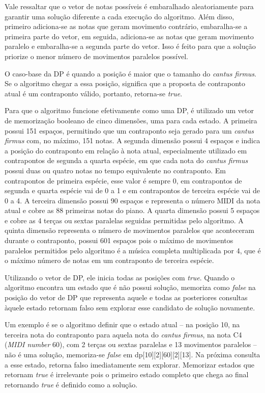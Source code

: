     Vale ressaltar que o vetor de notas possíveis é embaralhado aleatoriamente para garantir uma solução diferente a cada execução do algoritmo. Além disso, primeiro adiciona-se as notas que geram movimento contrário, embaralha-se a primeira parte do vetor, em seguida, adiciona-se as notas que geram movimento paralelo e embaralha-se a segunda parte do vetor. Isso é feito para que a solução priorize o menor número de movimentos paralelos possível.

    O caso-base da DP é quando a posição é maior que o tamanho do \textit{cantus firmus}. Se o algoritmo chegar a essa posição, significa que a proposta de contraponto atual é um contraponto válido, portanto, retorna-se \textit{true}.

    Para que o algoritmo funcione efetivamente como uma DP, é utilizado um vetor de memorização booleano de cinco dimensões, uma para cada estado. A primeira possui 151 espaços, permitindo que um contraponto seja gerado para um \textit{cantus firmus} com, no máximo, 151 notas. A segunda dimensão possui 4 espaços e indica a posição do contraponto em relação à nota atual, especialmente utilizado em contrapontos de segunda a quarta espécie, em que cada nota do \textit{cantus firmus} possui duas ou quatro notas no tempo equivalente no contraponto. Em contrapontos de primeira espécie, esse valor é sempre 0, em contrapontos de segunda e quarta espécie vai de 0 a 1 e em contrapontos de terceira espécie vai de 0 a 4. A terceira dimensão possui 90 espaços e representa o número MIDI da nota atual e cobre as 88 primeiras notas do piano. A quarta dimensão possui 5 espaços e cobre as 4 terças ou sextas paralelas seguidas permitidas pelo algoritmo. A quinta dimensão representa o número de movimentos paralelos que aconteceram durante o contraponto, possui 601 espaços pois o máximo de movimentos paralelos permitidos pelo algoritmo é a música completa multiplicada por 4, que é o máximo número de notas em um contraponto de terceira espécie.

    Utilizando o vetor de DP, ele inicia todas as posições com \textit{true}. Quando o algoritmo encontra um estado que é não possui solução, memoriza como \textit{false} na posição do vetor de DP que representa aquele e todas as posteriores consultas àquele estado retornam falso sem explorar esse candidato de solução novamente.

    Um exemplo é se o algoritmo definir que o estado atual -- na posição 10, na terceira nota do contraponto para aquela nota do \textit{cantus firmus}, na nota C4 (\textit{MIDI number} 60), com 2 terças ou sextas paralelas e 13 movimentos paralelos -- não é uma solução, memoriza-se \textit{false} em dp[10][2][60][2][13]. Na próxima consulta a esse estado, retorna falso imediatamente sem explorar. Memorizar estados que retornam \textit{true} é irrelevante pois o primeiro estado completo que chega ao final retornando \textit{true} é definido como a solução.

